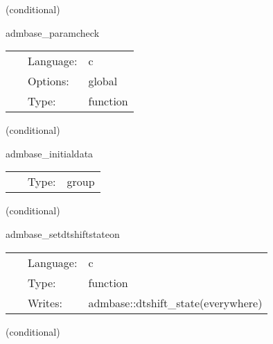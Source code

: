 \documentclass{article}
\begin{document}
   (conditional) 

\hspace{5mm} admbase\_paramcheck 

\hspace{5mm}{\it check consistency of parameters } 


\hspace{5mm}

 \begin{tabular*}{160mm}{cll} 
~ & Language:  & c \\ 
~ & Options:  & global \\ 
~ & Type:  & function \\ 
\end{tabular*} 


\vspace{5mm}

   (conditional) 

\hspace{5mm} admbase\_initialdata 

\hspace{5mm}{\it schedule group for calculating adm initial data } 


\hspace{5mm}

 \begin{tabular*}{160mm}{cll} 
~ & Type:  & group \\ 
\end{tabular*} 


\vspace{5mm}

   (conditional) 

\hspace{5mm} admbase\_setdtshiftstateon 

\hspace{5mm}{\it set the dtshift\_state variable to 1 } 


\hspace{5mm}

 \begin{tabular*}{160mm}{cll} 
~ & Language:  & c \\ 
~ & Type:  & function \\ 
~ & Writes:  & admbase::dtshift\_state(everywhere) \\ 
\end{tabular*} 


\vspace{5mm}

   (conditional) 
\end{document}
